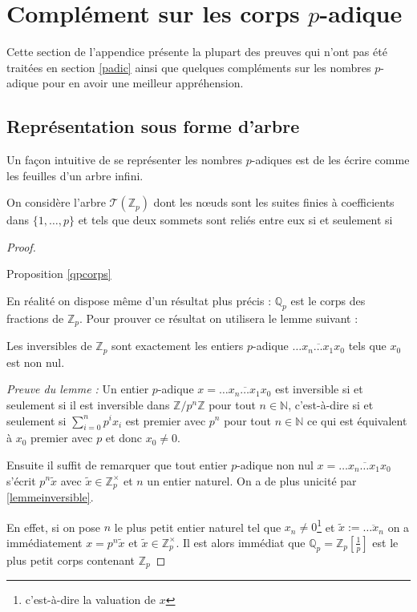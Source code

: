 \section{Complément sur les corps \texorpdfstring{$p$}{p}-adique}
\label{cpadic}

Cette section de l'appendice présente la plupart des preuves qui n'ont pas été traitées en section \ref{padic} ainsi que quelques compléments sur les nombres $p$-adique pour en avoir une meilleur appréhension.


\subsection*{Représentation sous forme d'arbre}
Un façon intuitive de se représenter les nombres $p$-adiques est de les écrire comme les feuilles d'un arbre infini.

On considère l'arbre $\mathcal{T}(\mathbb{Z}_p)$ dont les nœuds sont les suites finies à coefficients dans $\{1,\ldots,p\} $ et tels que deux sommets sont reliés entre eux si et seulement si 

\begin{proof} \hypertarget{qpcorpspreuve}{Proposition \ref{qpcorps}} 
En réalité on dispose même d'un résultat plus précis : $\mathbb{Q}_{p}$ est le corps des fractions de $\mathbb{Z}_p$. Pour prouver ce résultat on utilisera le lemme suivant :
\begin{lemme}
	\label{lemmeinversible} 
	Les inversibles de $\mathbb{Z}_p$ sont exactement les entiers $p$-adique $\overline{\ldots x_n\ldots x_1x_0}$ tels que $x_0$ est non nul.
\end{lemme}
\textit{Preuve du lemme :} 
Un entier $p$-adique $x = \overline{\ldots x_n \ldots x_1 x_0}$ est inversible si et seulement si il est inversible dans $\mathbb{Z}{/p^n\mathbb{Z}}$ pour tout $n \in \mathbb{N}$, c'est-à-dire si et seulement si $ \sum \limits_{i=0}^{n}p^i x_{i}$ est premier avec $p^n$ pour tout $n \in \mathbb{N}$ ce qui est équivalent à $x_0$ premier avec $p$ et donc $x_0 \neq 0$.

Ensuite il suffit de remarquer que tout entier $p$-adique non nul $x = \overline{\ldots x_n \ldots x_1 x_0}$ s'écrit $p^n \tilde{x}$ avec $\tilde{x} \in \mathbb{Z}_p^\times $ et $n$ un entier naturel. On a de plus unicité par \ref{lemmeinversible}. 

En effet, si on pose $n$ le plus petit entier naturel tel que $x_n \neq 0$\footnote{c'est-à-dire la valuation de $x$} et $\tilde{x} := \overline{\ldots x_n }$ on a immédiatement $ x = p^n \tilde{x}$ et $\tilde{x} \in \mathbb{Z}_p^\times $. Il est alors immédiat que $\mathbb{Q}_{p} = \mathbb{Z}_p[\frac{1}{p}]$ est le plus petit corps contenant $\mathbb{Z}_p$

\end{proof}

